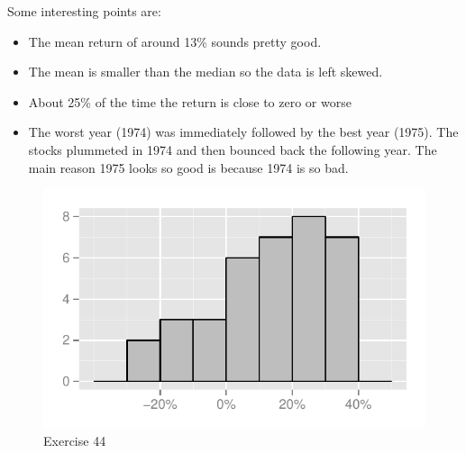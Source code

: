 \documentclass[letterpaper, landscape]{exam}
\begin{document}
\begin{description}
        Some interesting points are:
        \begin{itemize}
          \item The mean return of around 13\% sounds pretty good.
          \item The mean is smaller than the median so the data is left skewed.
          \item About 25\% of the time the return is close to zero or worse
          \item The worst year (1974) was immediately followed by the best year
            (1975).  The stocks plummeted in 1974 and then bounced back the following
            year.  The main reason 1975 looks so good is because 1974 is so bad.   
        \end{itemize}

        \begin{figure}[H]
          \centering
          \includegraphics{figures/ex44.pdf}
          \caption{Exercise 44}
        \end{figure}



\end{description}
\end{document}
